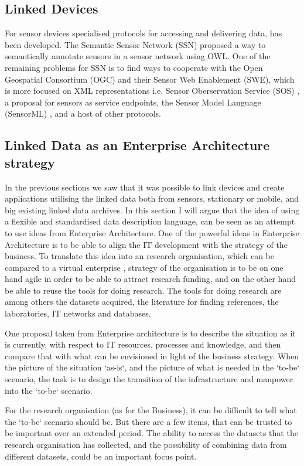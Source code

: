 \subsection{Linked Devices}
For sensor devices specialised protocols for accessing and delivering data, has been developed. The Semantic Sensor Network (SSN) proposed a way to semantically annotate sensors in a sensor network using OWL. One of the remaining problems for SSN is to find ways to cooperate with the Open Geospatial Consortium (OGC) and their Sensor Web Enablement (SWE), which is more focused on XML representations i.e. Sensor Oberservation Service (SOS) \cite{Henson2009}, a proposal for sensors as service endpoints, the Sensor Model Language (SensorML) \cite{russomanno2005}, and a host of other protocols.
\subsection{Linked Data as an Enterprise Architecture strategy}
In the previous sections we saw that it was possible to link devices and create applications utilising the linked data both from sensors, stationary or mobile, and big existing linked data archives. In this section I will argue that the idea of using a flexible and standardised data description language, can be seen as an attempt to use ideas from Enterprise Architecture. One of the powerful ideas in Enterprise Architecture is to be able to align the IT development with the strategy of the business. To translate this idea into an research organisation, which can be compared to a virtual enterprise \cite{February1998}, strategy of the organisation is to be on one hand agile in order to be able to attract research funding, and on the other hand be able to reuse the tools for doing research. The tools for doing research are among others the datasets acquired, the literature for finding references, the laboratories, IT networks and databases. 

One proposal taken from Enterprise architecture is to describe the situation as it is currently, with respect to IT resources, processes and knowledge, and then compare that with what can be envisioned in light of the business strategy. When the picture of the situation `as-is`, and the picture of what is needed in the `to-be` scenario, the task is to design the transition of the infrastructure and manpower into the `to-be` scenario.

For the research organisation (as for the Business), it can be difficult to tell what the `to-be` scenario should be. But there are a few items, that can be trusted to be important over an extended period. The ability to access the datasets that the research organisation has collected, and the possibility of combining data from different datasets, could be an important focus point.

